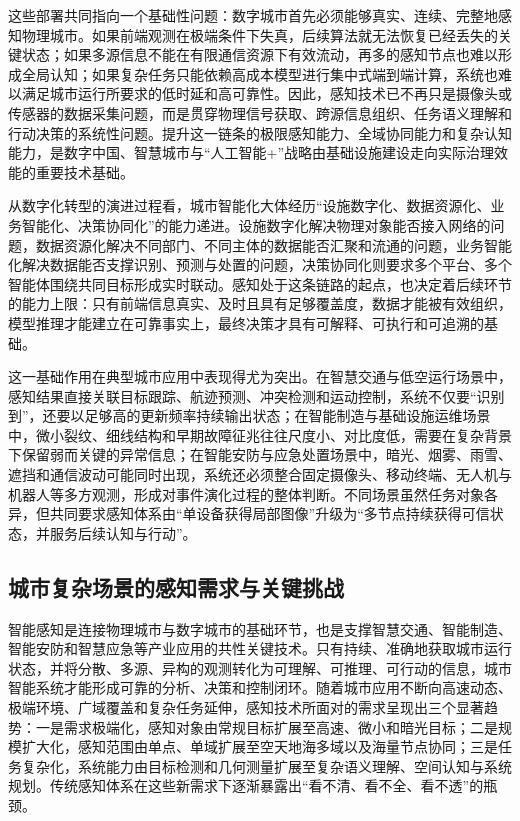 这些部署共同指向一个基础性问题：数字城市首先必须能够真实、连续、完整地感知物理城市。如果前端观测在极端条件下失真，后续算法就无法恢复已经丢失的关键状态；如果多源信息不能在有限通信资源下有效流动，再多的感知节点也难以形成全局认知；如果复杂任务只能依赖高成本模型进行集中式端到端计算，系统也难以满足城市运行所要求的低时延和高可靠性。因此，感知技术已不再只是摄像头或传感器的数据采集问题，而是贯穿物理信号获取、跨源信息组织、任务语义理解和行动决策的系统性问题。提升这一链条的极限感知能力、全域协同能力和复杂认知能力，是数字中国、智慧城市与“人工智能+”战略由基础设施建设走向实际治理效能的重要技术基础。

从数字化转型的演进过程看，城市智能化大体经历“设施数字化、数据资源化、业务智能化、决策协同化”的能力递进。设施数字化解决物理对象能否接入网络的问题，数据资源化解决不同部门、不同主体的数据能否汇聚和流通的问题，业务智能化解决数据能否支撑识别、预测与处置的问题，决策协同化则要求多个平台、多个智能体围绕共同目标形成实时联动。感知处于这条链路的起点，也决定着后续环节的能力上限：只有前端信息真实、及时且具有足够覆盖度，数据才能被有效组织，模型推理才能建立在可靠事实上，最终决策才具有可解释、可执行和可追溯的基础。

这一基础作用在典型城市应用中表现得尤为突出。在智慧交通与低空运行场景中，感知结果直接关联目标跟踪、航迹预测、冲突检测和运动控制，系统不仅要“识别到”，还要以足够高的更新频率持续输出状态；在智能制造与基础设施运维场景中，微小裂纹、细线结构和早期故障征兆往往尺度小、对比度低，需要在复杂背景下保留弱而关键的异常信息；在智能安防与应急处置场景中，暗光、烟雾、雨雪、遮挡和通信波动可能同时出现，系统还必须整合固定摄像头、移动终端、无人机与机器人等多方观测，形成对事件演化过程的整体判断。不同场景虽然任务对象各异，但共同要求感知体系由“单设备获得局部图像”升级为“多节点持续获得可信状态，并服务后续认知与行动”。

\subsection{城市复杂场景的感知需求与关键挑战}

智能感知是连接物理城市与数字城市的基础环节，也是支撑智慧交通、智能制造、智能安防和智慧应急等产业应用的共性关键技术。只有持续、准确地获取城市运行状态，并将分散、多源、异构的观测转化为可理解、可推理、可行动的信息，城市智能系统才能形成可靠的分析、决策和控制闭环。随着城市应用不断向高速动态、极端环境、广域覆盖和复杂任务延伸，感知技术所面对的需求呈现出三个显著趋势：一是需求极端化，感知对象由常规目标扩展至高速、微小和暗光目标；二是规模扩大化，感知范围由单点、单域扩展至空天地海多域以及海量节点协同；三是任务复杂化，系统能力由目标检测和几何测量扩展至复杂语义理解、空间认知与系统规划。传统感知体系在这些新需求下逐渐暴露出“看不清、看不全、看不透”的瓶颈。

